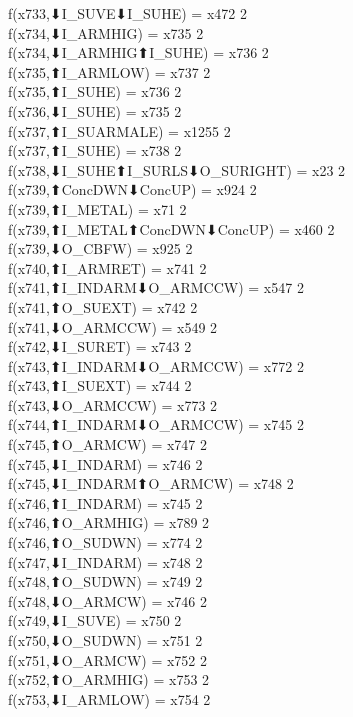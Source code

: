 f(x733,⬇I_SUVE⬇I_SUHE) = x472 {2} \\
f(x734,⬇I_ARMHIG) = x735 {2} \\
f(x734,⬇I_ARMHIG⬆I_SUHE) = x736 {2} \\
f(x735,⬆I_ARMLOW) = x737 {2} \\
f(x735,⬆I_SUHE) = x736 {2} \\
f(x736,⬇I_SUHE) = x735 {2} \\
f(x737,⬆I_SUARMALE) = x1255 {2} \\
f(x737,⬆I_SUHE) = x738 {2} \\
f(x738,⬇I_SUHE⬆I_SURLS⬇O_SURIGHT) = x23 {2} \\
f(x739,⬆ConcDWN⬇ConcUP) = x924 {2} \\
f(x739,⬆I_METAL) = x71 {2} \\
f(x739,⬆I_METAL⬆ConcDWN⬇ConcUP) = x460 {2} \\
f(x739,⬇O_CBFW) = x925 {2} \\
f(x740,⬆I_ARMRET) = x741 {2} \\
f(x741,⬆I_INDARM⬇O_ARMCCW) = x547 {2} \\
f(x741,⬆O_SUEXT) = x742 {2} \\
f(x741,⬇O_ARMCCW) = x549 {2} \\
f(x742,⬇I_SURET) = x743 {2} \\
f(x743,⬆I_INDARM⬇O_ARMCCW) = x772 {2} \\
f(x743,⬆I_SUEXT) = x744 {2} \\
f(x743,⬇O_ARMCCW) = x773 {2} \\
f(x744,⬆I_INDARM⬇O_ARMCCW) = x745 {2} \\
f(x745,⬆O_ARMCW) = x747 {2} \\
f(x745,⬇I_INDARM) = x746 {2} \\
f(x745,⬇I_INDARM⬆O_ARMCW) = x748 {2} \\
f(x746,⬆I_INDARM) = x745 {2} \\
f(x746,⬆O_ARMHIG) = x789 {2} \\
f(x746,⬆O_SUDWN) = x774 {2} \\
f(x747,⬇I_INDARM) = x748 {2} \\
f(x748,⬆O_SUDWN) = x749 {2} \\
f(x748,⬇O_ARMCW) = x746 {2} \\
f(x749,⬇I_SUVE) = x750 {2} \\
f(x750,⬇O_SUDWN) = x751 {2} \\
f(x751,⬇O_ARMCW) = x752 {2} \\
f(x752,⬆O_ARMHIG) = x753 {2} \\
f(x753,⬇I_ARMLOW) = x754 {2} \\
